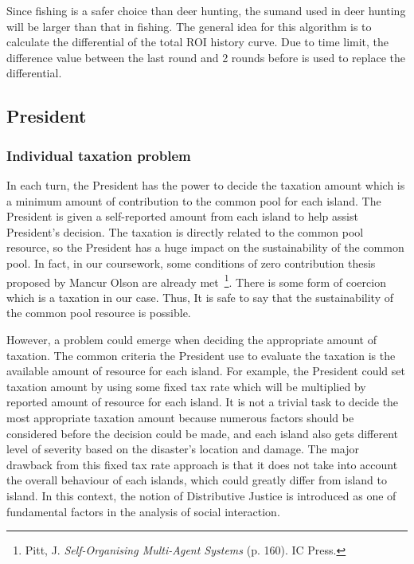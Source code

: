 Since fishing is a safer choice than deer hunting, the sumand used in deer hunting will be larger than that in fishing. The general idea for this algorithm is to calculate the differential of the total ROI history curve. Due to time limit, the difference value between the last round and 2 rounds before is used to replace the differential.

\subsection{President} \label{subsec:Team6_President}
\subsubsection{Individual taxation problem} \label{subsubsec:Team6_President:Dilemma}
In each turn, the President has the power to decide the taxation amount which is a minimum amount of contribution to the common pool for each island. The President is given a self-reported amount from each island to help assist President’s decision. The taxation is directly related to the common pool resource, so the President has a huge impact on the sustainability of the common pool. In fact, in our coursework, some conditions of zero contribution thesis proposed by Mancur Olson are already met~\footnote{Pitt, J. \textit{Self-Organising Multi-Agent Systems} (p. 160). IC Press.}. There is some form of coercion which is a taxation in our case. Thus, It is safe to say that the sustainability of the common pool resource is possible.

However, a problem could emerge when deciding the appropriate amount of taxation. The common criteria the President use to evaluate the taxation is the available amount of resource for each island. For example, the President could set taxation amount by using some fixed tax rate which will be multiplied by reported amount of resource for each island. It is not a trivial task to decide the most appropriate taxation amount because numerous factors should be considered before the decision could be made, and each island also gets different level of severity based on the disaster’s location and damage. The major drawback from this fixed tax rate approach is that it does not take into account the overall behaviour of each islands, which could greatly differ from island to island. In this context, the notion of Distributive Justice is introduced as one of fundamental factors in the analysis of social interaction.

